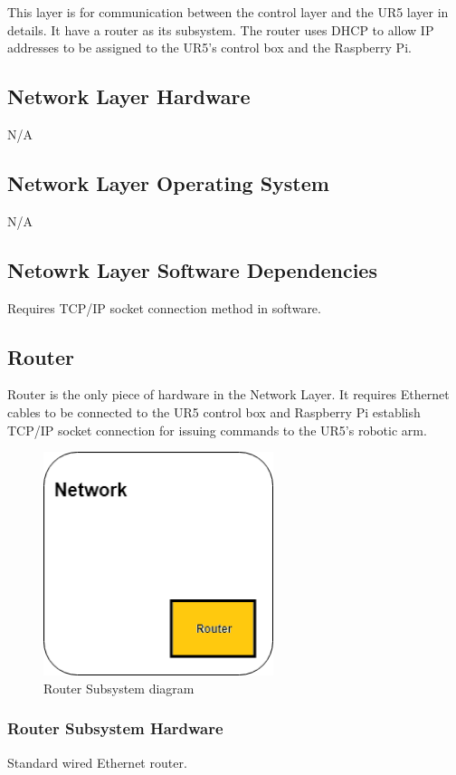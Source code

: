 This layer is for communication between the control layer and the UR5 layer in details. It have a router as its subsystem. The router uses DHCP to allow IP addresses to be assigned to the UR5's control box and the Raspberry Pi.

\subsection{Network Layer Hardware}
N/A

\subsection{Network Layer Operating System}
N/A

\subsection{Netowrk Layer Software Dependencies}
Requires TCP/IP socket connection method in software.

\subsection{Router}
Router is the only piece of hardware in the Network Layer. It requires Ethernet cables to be connected to the UR5 control box and Raspberry Pi  establish  TCP/IP socket connection for issuing commands to the UR5's robotic arm.

\begin{figure}[h!]
	\centering
 	\includegraphics[width=0.60\textwidth]{images/Network_Layer_Router}
 \caption{Router Subsystem diagram}
\end{figure}

\subsubsection{Router Subsystem Hardware}
Standard wired Ethernet router.

